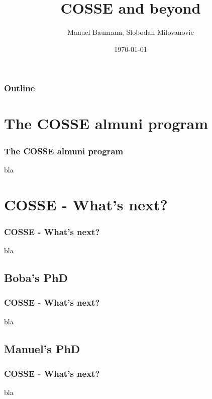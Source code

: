 \documentclass{beamer}
\title{\huge{COSSE and beyond}}
\author{Manuel Baumann, Slobodan Milovanovic}
\date{\footnotesize{\today}}
\begin{document}
\frame{\titlepage}
\begin{frame}
\frametitle{Outline}
\tableofcontents
\end{frame}

\section{The COSSE almuni program}
\begin{frame}
\frametitle{The COSSE almuni program}
 bla
\end{frame}

\section{COSSE - What's next?}
\begin{frame}
\frametitle{COSSE - What's next?}
 bla
\end{frame}
\subsection{Boba's PhD}
\begin{frame}
\frametitle{COSSE - What's next?}
 bla
\end{frame}
\subsection{Manuel's PhD}
\begin{frame}
\frametitle{COSSE - What's next?}
 bla
\end{frame}
\end{document}
